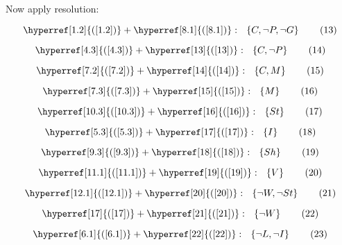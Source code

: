 \documentclass[a4paper]{article}
\newcommand{\refequation}[1]{\hyperref[#1]{(\ref{#1})}}
\begin{document}
Now apply resolution:

\begin{equation}
\refequation{1.2} + \refequation{8.1}: \  \ \left\{ C , \lnot P , \lnot G \right\} \tag{13} \label{13}
\end{equation}

\begin{equation}
\refequation{4.3} + \refequation{13}: \  \ \left\{ C , \lnot P \right\} \tag{14} \label{14}
\end{equation}

\begin{equation}
\refequation{7.2} + \refequation{14}: \  \ \left\{ C , M \right\} \tag{15} \label{15}
\end{equation}

\begin{equation}
\refequation{7.3} + \refequation{15}: \  \ \left\{ M \right\} \tag{16} \label{16}
\end{equation}

\begin{equation}
\refequation{10.3} + \refequation{16}: \  \ \left\{ St \right\} \tag{17} \label{17}
\end{equation}

\begin{equation}
\refequation{5.3} + \refequation{17}: \  \ \left\{ I \right\} \tag{18} \label{18}
\end{equation}

\begin{equation}
\refequation{9.3} + \refequation{18}: \  \ \left\{ Sh \right\} \tag{19} \label{19}
\end{equation}

\begin{equation}
\refequation{11.1} + \refequation{19}: \  \ \left\{ V \right\} \tag{20} \label{20}
\end{equation}

\begin{equation}
\refequation{12.1} + \refequation{20}: \  \ \left\{ \lnot W , \lnot St \right\} \tag{21} \label{21}
\end{equation}

\begin{equation}
\refequation{17} + \refequation{21}: \  \ \left\{ \lnot W \right\} \tag{22} \label{22}
\end{equation}

\begin{equation}
\refequation{6.1} + \refequation{22}: \  \ \left\{ \lnot L , \lnot I \right\} \tag{23} \label{23}
\end{equation}
\end{document}

